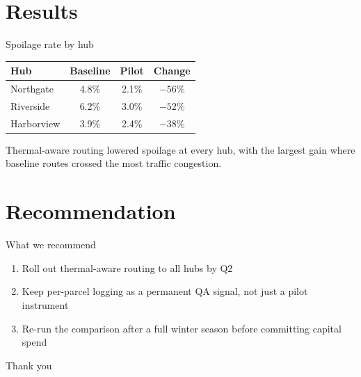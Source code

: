 \documentclass[hyperref, UTF8, aspectratio=169]{beamer}
\begin{document}
\section{Results}

\begin{frame}{Spoilage rate by hub}
	\begin{table}
		\centering
		\begin{tabular}{lccc}
			\toprule
			Hub & Baseline & Pilot & Change \\
			\midrule
			Northgate  & 4.8\% & 2.1\% & $-56\%$ \\
			Riverside  & 6.2\% & 3.0\% & $-52\%$ \\
			Harborview & 3.9\% & 2.4\% & $-38\%$ \\
			\bottomrule
		\end{tabular}
	\end{table}
	Thermal-aware routing lowered spoilage at every hub, with the largest gain where baseline routes crossed the most traffic congestion.
\end{frame}

\section{Recommendation}

\begin{frame}{What we recommend}
	\begin{enumerate}
		\item Roll out thermal-aware routing to all hubs by Q2
		\item Keep per-parcel logging as a permanent QA signal, not just a pilot instrument
		\item Re-run the comparison after a full winter season before committing capital spend
	\end{enumerate}
\end{frame}

\begin{frame}
	\centering
	\Huge Thank you
\end{frame}
\end{document}

